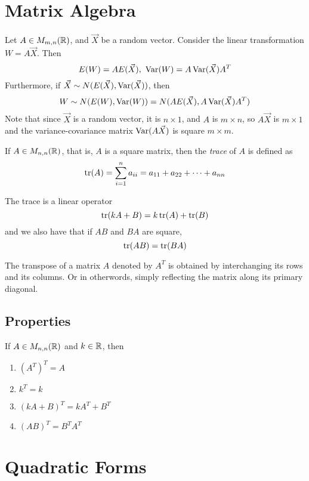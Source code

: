 \section{Matrix Algebra}
Let $A \in M_{m,n}(\mathbb{R})$, and $\vec{X}$ be a random vector. Consider the linear transformation $W = A\vec{X}$. Then 
\[E(W) = AE(\vec{X}), \ \operatorname{Var}(W) = A\operatorname{Var}(\vec{X})A^T\]
Furthermore, if $\vec{X} \sim N(E(\vec{X}), \operatorname{Var}(\vec{X}))$, then 
\[W \sim N(E(W), \operatorname{Var}(W)) = N(AE(\vec{X}), A\operatorname{Var}({\vec{X}})A^T)\]
Note that since $\vec{X}$ is a random vector, it is $n\times 1$, and $A$ is $m \times n$, so $A\vec{X}$ is $m \times 1$ and the variance-covariance matrix $\operatorname{Var}(A\vec{X})$ is square $m \times m$. 
\begin{definition}[Trace]
    If $A \in M_{n,n}(\mathbb{R})$, that is, $A$ is a square matrix, then the \emph{trace} of $A$ is defined as 
    \[\operatorname{tr}(A) = \sum_{i=1}^n a_{ii} = a_{11} + a_{22} + \cdots + a_{nn}\]
\end{definition}
\noindent 
The trace is a linear operator 
\[\operatorname{tr}(kA + B) = k\operatorname{tr}(A) + \operatorname{tr}(B)\]
and we also have that if $AB$ and $BA$ are square, 
\[\operatorname{tr}(AB) = \operatorname{tr}(BA)\]
\begin{definition}[Transpose]
    The transpose of a matrix $A$ denoted by $A^T$ is obtained by interchanging its rows and its columns. Or in otherwords, simply reflecting the matrix along its primary diagonal.
\end{definition}
\subsection*{Properties}
If $A \in M_{n,n}(\mathbb{R})$ and $k \in \mathbb{R}$, then 
\begin{enumerate}[label=(\roman*)]
    \item $(A^T)^T = A$ 
    \item $k^T = k$ 
    \item $(kA + B)^T = kA^T + B^T$ 
    \item $(AB)^T = B^TA^T$
\end{enumerate}

\section{Quadratic Forms}